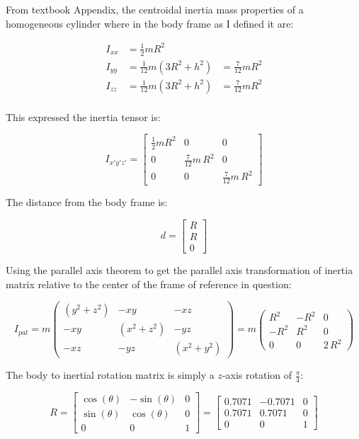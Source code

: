 \documentclass[12pt, letterpaper]{../assignment}
\begin{document}
From textbook Appendix,
the centroidal inertia mass properties of a homogeneous cylinder where in the body frame as I defined it are:

\begin{equation*}
    \begin{aligned}
        I_{xx} &= \frac{1}{2} m R^2 & \\
        I_{yy} &= \frac{1}{12} m \left(3 R^2+h^2\right) &= \frac{7}{12} m R^2\\
        I_{zz} &= \frac{1}{12} m \left(3 R^2+h^2\right) &= \frac{7}{12} m R^2\\
    \end{aligned}
\end{equation*}

This expressed the inertia tensor is:

$$ I_{x'y'z'} = \left[\begin{array}{ccc} \frac{1}{2} m R^2 & 0 & 0\\
    0 & \frac{7}{12} m\,R^2 & 0\\ 0 & 0 & \frac{7}{12}m\,R^2 \end{array}\right] $$

The distance from the body frame is:

$$ d = \left[\begin{array}{c} R\\ R\\ 0 \end{array}\right] $$

Using the parallel axis theorem to get the parallel axis transformation of inertia matrix
relative to the center of the frame of reference in question:

$$ I_{pat} = 
m\left(\begin{array}{ccc} \left(y^2 + z^2\right) & -xy & -xz\\
    -xy & \left(x^2 + z^2\right) & -yz\\
       -xz & -yz & \left(x^2 + y^2\right) \end{array}\right)
= m\left(\begin{array}{ccc} R^2 & -R^2 & 0\\ -R^2 & R^2 & 0\\ 0 & 0 & 2\,R^2 \end{array}\right)$$

The body to inertial rotation matrix is simply a $z$-axis rotation of $\frac{\pi}{4}$:

$$ R = \left[\begin{array}{ccc} \cos\left(\theta \right) & -\sin\left(\theta \right) & 0\\ \sin\left(\theta \right) & \cos\left(\theta \right) & 0\\ 0 & 0 & 1 \end{array}\right]
= \left[\begin{array}{ccc} 0.7071 & -0.7071 & 0\\ 0.7071 & 0.7071 & 0\\ 0 & 0 & 1 \end{array}\right]$$
\end{document}
